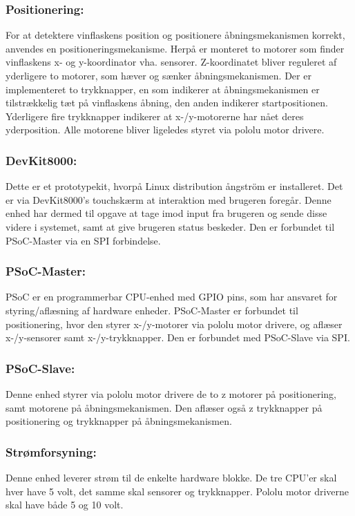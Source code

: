 \subsubsection{Positionering:}
For at detektere vinflaskens position og positionere åbningsmekanismen korrekt, anvendes en positioneringsmekanisme. Herpå er monteret to motorer som finder
vinflaskens x- og y-koordinator vha. sensorer. Z-koordinatet bliver reguleret af yderligere to motorer, som hæver og sænker åbningsmekanismen. 
Der er implementeret to trykknapper, en som indikerer at åbningsmekanismen er tilstrækkelig tæt på vinflaskens åbning, den anden indikerer startpositionen. 
Yderligere fire trykknapper indikerer at x-/y-motorerne har nået deres yderposition. Alle motorene bliver ligeledes styret via pololu motor drivere. \\

\subsubsection{DevKit8000:}
Dette er et prototypekit, hvorpå Linux distribution ångström er installeret. Det er via DevKit8000's touchskærm at interaktion med brugeren foregår. 
Denne enhed har dermed til opgave at tage imod input fra brugeren og sende disse videre i systemet, samt at give brugeren status beskeder. Den er forbundet til PSoC-Master via en SPI forbindelse. \\

\subsubsection{PSoC-Master:}
PSoC er en programmerbar CPU-enhed med GPIO pins, som har ansvaret for styring/aflæsning af hardware enheder. PSoC-Master er forbundet til positionering, 
hvor den styrer x-/y-motorer via pololu motor drivere, og aflæser x-/y-sensorer samt x-/y-trykknapper. Den er forbundet med PSoC-Slave via SPI. \\

\subsubsection{PSoC-Slave:}
Denne enhed styrer via pololu motor drivere de to z motorer på positionering, samt motorene på åbningsmekanismen. Den aflæser også z trykknapper på 
positionering og trykknapper på åbningsmekanismen. \\

\subsubsection{Strømforsyning:}
Denne enhed leverer strøm til de enkelte hardware blokke. De tre CPU'er skal hver have 5 volt, det samme skal sensorer og trykknapper. Pololu motor driverne 
skal have både 5 og 10 volt. \\

